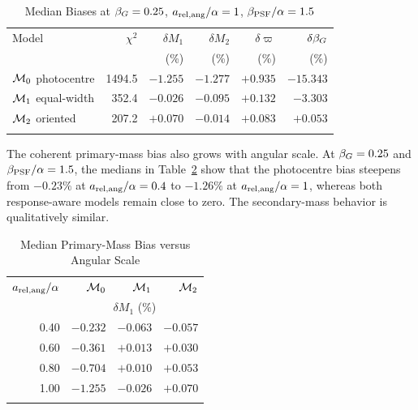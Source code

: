 \begin{table}
\begin{center}
\caption{Median Biases at $\beta_G=0.25$, $a_{\rm rel,ang}/\alpha=1$, $\beta_{\rm PSF}/\alpha=1.5$}
\label{tab:fidelitycentral}
\begin{tabular}{lrrrrr}
\hline\noalign{\smallskip}
Model & $\chi^2$ & $\delta M_1$ & $\delta M_2$ & $\delta\varpi$ & $\delta\beta_G$\\
 &  & (\%) & (\%) & (\%) & (\%)\\
\hline\noalign{\smallskip}
$\mathcal{M}_0$ photocentre & 1494.5 & $-1.255$ & $-1.277$ & $+0.935$ & $-15.343$\\
$\mathcal{M}_1$ equal-width & 352.4 & $-0.026$ & $-0.095$ & $+0.132$ & $-3.303$\\
$\mathcal{M}_2$ oriented & 207.2 & $+0.070$ & $-0.014$ & $+0.083$ & $+0.053$\\
\noalign{\smallskip}\hline
\end{tabular}
\end{center}
\end{table}

The coherent primary-mass bias also grows with angular scale. At $\beta_G=0.25$ and $\beta_{\rm PSF}/\alpha=1.5$, the medians in Table~\ref{tab:massseparation} show that the photocentre bias steepens from $-0.23\%$ at $a_{\rm rel,ang}/\alpha=0.4$ to $-1.26\%$ at $a_{\rm rel,ang}/\alpha=1$, whereas both response-aware models remain close to zero. The secondary-mass behavior is qualitatively similar.

\begin{table}
\begin{center}
\caption{Median Primary-Mass Bias versus Angular Scale}
\label{tab:massseparation}
\begin{tabular}{rrrr}
\hline\noalign{\smallskip}
$a_{\rm rel,ang}/\alpha$ & $\mathcal{M}_0$ & $\mathcal{M}_1$ & $\mathcal{M}_2$\\
 & \multicolumn{3}{c}{$\delta M_1$ (\%)}\\
\hline\noalign{\smallskip}
0.40 & $-0.232$ & $-0.063$ & $-0.057$\\
0.60 & $-0.361$ & $+0.013$ & $+0.030$\\
0.80 & $-0.704$ & $+0.010$ & $+0.053$\\
1.00 & $-1.255$ & $-0.026$ & $+0.070$\\
\noalign{\smallskip}\hline
\end{tabular}
\end{center}
\end{table}

